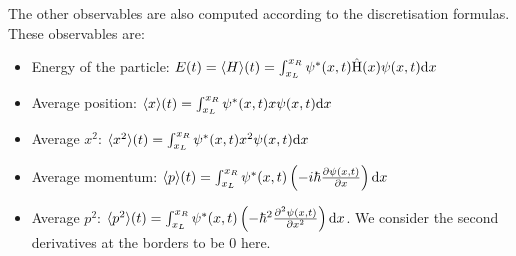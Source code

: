 The other observables are also computed according to the discretisation formulas. These observables are:
\begin{itemize}
    \item Energy of the particle: \(E(t) = \langle H \rangle(t) = \int_{x_L}^{x_R} \psi^*(x,t) \hat{\mathrm{H}}(x) \psi(x,t) \mathrm{d} x\)
    \item Average position: \(\langle x \rangle(t) = \int_{x_L}^{x_R} \psi^*(x,t) x \psi(x,t) \mathrm{d} x\)
    \item Average \(x^2\): \(\langle x^2 \rangle(t) = \int_{x_L}^{x_R} \psi^*(x,t) x^2 \psi(x,t) \mathrm{d} x\)
    \item Average momentum: \(\langle p \rangle(t) = \int_{x_L}^{x_R} \psi^*(x,t) \left( -i \hbar \frac{\partial \psi(x,t)}{\partial x} \right) \mathrm{d} x\)
    \item Average \(p^2\): \(\langle p^2 \rangle(t) = \int_{x_L}^{x_R} \psi^*(x,t) \left( - \hbar^2 \frac{\partial^2 \psi(x,t)}{\partial x^2} \right) \mathrm{d} x\). We consider the second derivatives at the borders to be \(0\) here.
\end{itemize}
